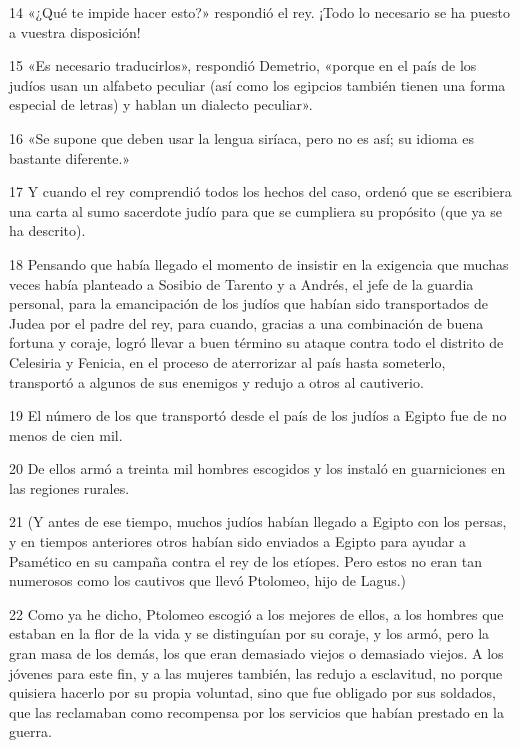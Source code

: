 \par 14 «¿Qué te impide hacer esto?» respondió el rey. ¡Todo lo necesario se ha puesto a vuestra disposición!

\par 15 «Es necesario traducirlos», respondió Demetrio, «porque en el país de los judíos usan un alfabeto peculiar (así como los egipcios también tienen una forma especial de letras) y hablan un dialecto peculiar».

\par 16 «Se supone que deben usar la lengua siríaca, pero no es así; su idioma es bastante diferente.»

\par 17 Y cuando el rey comprendió todos los hechos del caso, ordenó que se escribiera una carta al sumo sacerdote judío para que se cumpliera su propósito (que ya se ha descrito).

\par 18 Pensando que había llegado el momento de insistir en la exigencia que muchas veces había planteado a Sosibio de Tarento y a Andrés, el jefe de la guardia personal, para la emancipación de los judíos que habían sido transportados de Judea por el padre del rey, para cuando, gracias a una combinación de buena fortuna y coraje, logró llevar a buen término su ataque contra todo el distrito de Celesiria y Fenicia, en el proceso de aterrorizar al país hasta someterlo, transportó a algunos de sus enemigos y redujo a otros al cautiverio.

\par 19 El número de los que transportó desde el país de los judíos a Egipto fue de no menos de cien mil.

\par 20 De ellos armó a treinta mil hombres escogidos y los instaló en guarniciones en las regiones rurales.

\par 21 (Y antes de ese tiempo, muchos judíos habían llegado a Egipto con los persas, y en tiempos anteriores otros habían sido enviados a Egipto para ayudar a Psamético en su campaña contra el rey de los etíopes. Pero estos no eran tan numerosos como los cautivos que llevó Ptolomeo, hijo de Lagus.)

\par 22 Como ya he dicho, Ptolomeo escogió a los mejores de ellos, a los hombres que estaban en la flor de la vida y se distinguían por su coraje, y los armó, pero la gran masa de los demás, los que eran demasiado viejos o demasiado viejos. A los jóvenes para este fin, y a las mujeres también, las redujo a esclavitud, no porque quisiera hacerlo por su propia voluntad, sino que fue obligado por sus soldados, que las reclamaban como recompensa por los servicios que habían prestado en la guerra.

